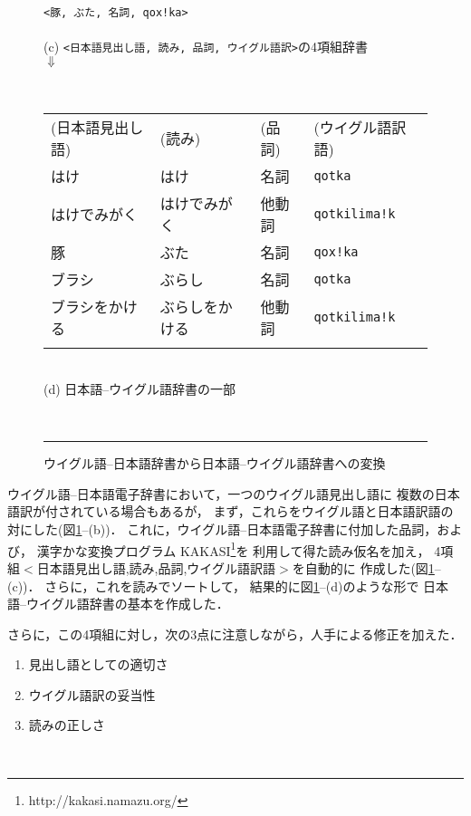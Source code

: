 {\begin{figure}[p]
\begin{center}
\begin{minipage}{0.9\textwidth}
 \verb+<豚, ぶた, 名詞, qox!ka>+ \\ \\
\hspace*{2cm}(c) \verb+<日本語見出し語, 読み, 品詞, ウイグル語訳>+の4項組辞書\\
\hspace*{4cm}$\Downarrow$\\
\end{minipage} \\
\begin{minipage}{0.9\textwidth}
\begin{tabular}{llll}
 (日本語見出し語) & (読み) & (品詞) & (ウイグル語訳語) \\
 はけ & はけ & 名詞 & \verb+qotka+ \\
 はけでみがく & はけでみがく & 他動詞 & \verb+qotkilima!k+\\
 豚 & ぶた & 名詞 & \verb+qox!ka+\\
 ブラシ & ぶらし & 名詞 & \verb+qotka+ \\
 ブラシをかける & ぶらしをかける & 他動詞 & \verb+qotkilima!k+ \\ \\
\end{tabular} \\
\hspace*{2cm}(d) 日本語--ウイグル語辞書の一部 \\
\end{minipage} \\
\rule{0.9\textwidth}{0.2mm} 
\caption{ウイグル語--日本語辞書から日本語--ウイグル語辞書への変換} 
\label{fig:convert}
\end{center}
\end{figure}
ウイグル語--日本語電子辞書において，一つのウイグル語見出し語に
複数の日本語訳が付されている場合もあるが，
まず，これらをウイグル語と日本語訳語の対にした(図\ref{fig:convert}--(b))．
これに，ウイグル語--日本語電子辞書に付加した品詞，および，
漢字かな変換プログラム KAKASI\footnote{http://kakasi.namazu.org/}を
利用して得た読み仮名を加え，
4項組$<$日本語見出し語,読み,品詞,ウイグル語訳語$>$を自動的に
作成した(図\ref{fig:convert}--(c))．
さらに，これを読みでソートして，
結果的に図\ref{fig:convert}--(d)のような形で
日本語--ウイグル語辞書の基本を作成した．

さらに，この4項組に対し，次の3点に注意しながら，人手による修正を加えた．\\ 

\begin{enumerate}
 \item[1)] 見出し語としての適切さ
 \item[2)] ウイグル語訳の妥当性
 \item[3)] 読みの正しさ
\end{enumerate}
~

}
